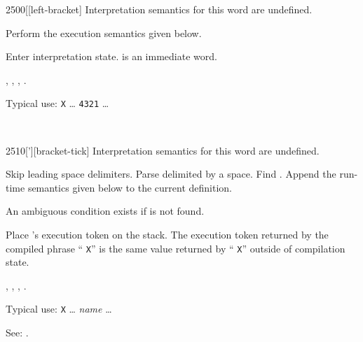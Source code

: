 \vspace*{-3ex}
\begin{worddef}{2500}{[}[left-bracket]
\interpret
	Interpretation semantics for this word are undefined.

\compile
	Perform the execution semantics given below.

\execute
	\stack{}{}

	Enter interpretation state. \word{[} is an immediate word.

\see {},
	,
	\wref{core:]}{]},
	\rref{core:[}{}.

	\begin{rationale} %
		Typical use:
			\word{:} \texttt{X} {\ldots}
				\word{[} \texttt{4321} \word{]} 
				{\ldots} \word{;}
	\end{rationale}

	\begin{testing} %
		 \\
	\end{testing}
\end{worddef}

\vspace*{-3ex}
\begin{worddef}{2510}{[']}[bracket-tick]
\interpret
	Interpretation semantics for this word are undefined.

\compile

	Skip leading space delimiters. Parse  delimited by
	a space. Find . Append the run-time semantics given
	below to the current definition.

	An ambiguous condition exists if  is not found.

\runtime

	Place 's execution token  on the stack.
	The execution token returned by the compiled phrase
	``\word{[']} \texttt{X}'' is the same value returned by
	`` \texttt{X}'' outside of compilation state.

\see {},
	,
	,\newline
	.

	\begin{rationale} %
		Typical use:
			\word{:} \texttt{X} {\ldots}
				\word{[']} \emph{name}
				{\ldots} \word{;}

		See:
			.
	\end{rationale}

	\begin{testing} %
		 \\
	\end{testing}
\end{worddef}

